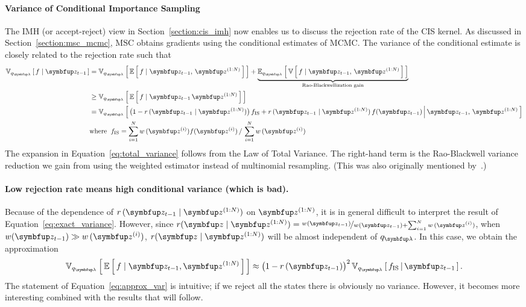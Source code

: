 \paragraph{Variance of Conditional Importance Sampling}
The IMH (or accept-reject) view in Section~\ref{section:cis_imh} now enables us to discuss the rejection rate of the CIS kernel.
As discussed in Section~\ref{section:msc_mcmc}, MSC obtains gradients using the conditional estimates of MCMC.
The variance of the conditional estimate is closely related to the rejection rate such that
\begin{align}
  \Vsub{q_{\vlambda}}{f \mid \vz_{t-1}} &= \Vsub{q_{\vlambda}}{ \E{ f \mid \vz_{t-1},\,\vz^{(1:N)} } } + \underbrace{\Esub{q_{\vlambda}}{ \V{ f \mid \vz_{t-1},\,\vz^{(1:N)} } }}_{\text{Rao-Blackwellization gain}} \label{eq:total_variance} \\
  &\geq \Vsub{q_{\vlambda}}{ \E{ f \mid \vz_{t-1}\,\vz^{(1:N)} } } \\
  &= \Vsub{q_{\vlambda}}{ \big(1 - r\,(\vz_{t-1}\mid\vz^{(1:N)})\big)\, f_{\mathrm{IS}}
    + r\,(\vz_{t-1}\mid\vz^{(1:N)})\,f(\vz_{t-1}) \,\middle\vert\, \vz_{t-1},\, \vz^{(1:N)} } \label{eq:exact_variance} \\
  &\text{where}\;\; f_{\mathrm{IS}} = {\sum_{i=1}^N w\,(\vz^{(i)}) f(\vz^{(i)})\,/\,\sum_{i=1}^N w\,(\vz^{(i)})} \nonumber 
\end{align}
%
The expansion in Equation~\eqref{eq:total_variance} follows from the Law of Total Variance.
The right-hand term is the Rao-Blackwell variance reduction we gain from using the weighted estimator instead of multinomial resampling. (This was also originally mentioned by~\citet{NEURIPS2020_b2070693}.)

\paragraph{Low rejection rate means high conditional variance (which is bad).}
Because of the dependence of \(r\,(\vz_{t-1}\mid\vz^{(1:N)})\) on \(\vz^{(1:N)}\), it is in general difficult to interpret the result of Equation~\eqref{eq:exact_variance}.
However, since \(r(\vz\mid\vz^{(1:N)}) = \nicefrac{w(\vz_{t-1})}{w(\vz_{t-1}) + \sum_{i=1}^N w\,(\vz^{(i)})}\), when \(w(\vz_{t-1}) \gg w\,(\vz^{(i)})\), \(r(\vz\mid\vz^{(1:N)})\) will be almost independent of \(q_{\vlambda}\).
In this case, we obtain the approximation
\begin{align}
  \Vsub{q_{\vlambda}}{ \E{ f \mid \vz_{t-1}, \vz^{(1:N)} } } \approx {\big(1 - r\,(\vz_{t-1})\big)}^2\,\Vsub{q_{\vlambda}}{ f_{\text{IS}} \,\middle\vert\, \vz_{t-1} }.\label{eq:approx_var}
\end{align}
The statement of Equation~\eqref{eq:approx_var} is intuitive; if we reject all the states there is obviously no variance.
However, it becomes more interesting combined with the results that will follow.

